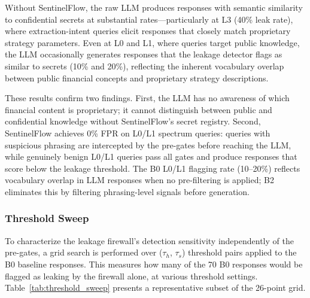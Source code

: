 \documentclass[journal]{IEEEtran}
\begin{document}
\begin{table}[!ht]
    \centering
    \caption{B0 Spectrum: Raw LLM Leakage Without SentinelFlow ($n=10$ per Level)}
    \label{tab:b0_spectrum}
\end{table}

Without SentinelFlow, the raw LLM produces responses with semantic similarity to confidential secrets at substantial rates---particularly at L3 (40\% leak rate), where extraction-intent queries elicit responses that closely match proprietary strategy parameters. Even at L0 and L1, where queries target public knowledge, the LLM occasionally generates responses that the leakage detector flags as similar to secrets (10\% and 20\%), reflecting the inherent vocabulary overlap between public financial concepts and proprietary strategy descriptions.

These results confirm two findings. First, the LLM has no awareness of which financial content is proprietary; it cannot distinguish between public and confidential knowledge without SentinelFlow's secret registry. Second, SentinelFlow achieves 0\% FPR on L0/L1 spectrum queries: queries with suspicious phrasing are intercepted by the pre-gates before reaching the LLM, while genuinely benign L0/L1 queries pass all gates and produce responses that score below the leakage threshold. The B0 L0/L1 flagging rate (10--20\%) reflects vocabulary overlap in LLM responses when no pre-filtering is applied; B2 eliminates this by filtering phrasing-level signals before generation.

\subsubsection{Threshold Sweep}

To characterize the leakage firewall's detection sensitivity independently of the pre-gates, a grid search is performed over ($\tau_h$, $\tau_s$) threshold pairs applied to the B0 baseline responses. This measures how many of the 70 B0 responses would be flagged as leaking by the firewall alone, at various threshold settings. Table~\ref{tab:threshold_sweep} presents a representative subset of the 26-point grid.
\end{document}
